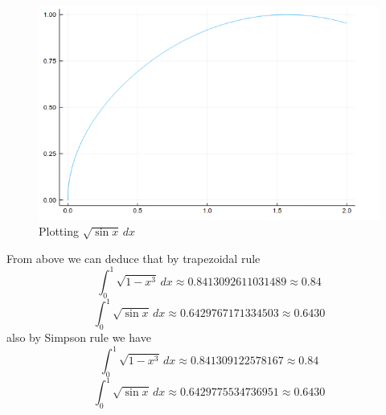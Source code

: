 \documentclass[a4paper,12pt,openany]{book}
\begin{document}
\begin{soln}
\begin{figure}[H]
	\centering
	\includegraphics[width=.7\linewidth]{pic25}
	\caption{Plotting $ \sqrt{\sin x} \, dx$ }
\end{figure}



From above we can deduce that by trapezoidal rule $$\int_{0}^{1} \sqrt{1 - x^3} \, dx \approx 0.8413092611031489 \approx 0.84 $$
$$\int_{0}^{1} \sqrt{\sin x} \, dx \approx 0.6429767171334503 \approx 0.6430$$
also by Simpson rule we have $$\int_{0}^{1} \sqrt{1 - x^3} \, dx \approx 0.841309122578167 \approx 0.84 $$
$$\int_{0}^{1} \sqrt{\sin x} \, dx \approx 0.6429775534736951 \approx 0.6430$$
\end{soln}
\end{document}
